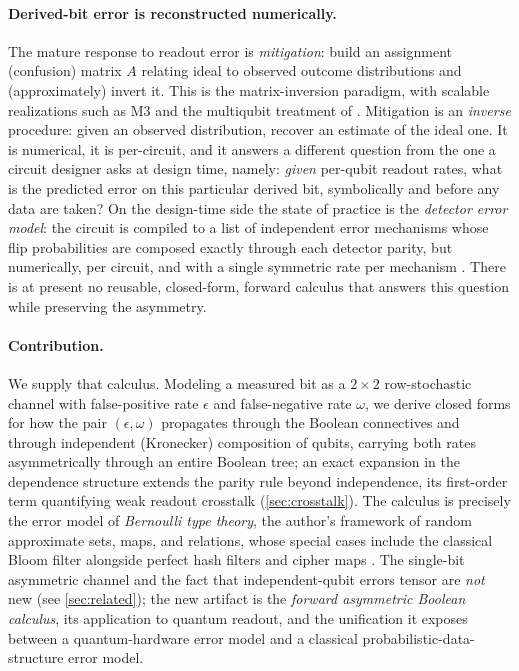 \documentclass[a4paper,onecolumn,unpublished,nopdfoutputerror,allowtoday]{quantumarticle}
\numberwithin{equation}{section}
\theoremstyle{plain}
\theoremstyle{definition}
\theoremstyle{remark}
\newcommand{\eps}{\epsilon}
\begin{document}
\paragraph{Derived-bit error is reconstructed numerically.} The mature response
to readout error is \emph{mitigation}: build an assignment (confusion) matrix $A$
relating ideal to observed outcome distributions and (approximately) invert it.
This is the matrix-inversion paradigm, with scalable realizations such as M3
\citep{nation2021m3} and the multiqubit treatment of \citet{bravyi2021mitigating}.
Mitigation is an \emph{inverse} procedure: given an observed distribution, recover
an estimate of the ideal one. It is numerical, it is per-circuit, and it answers
a different question from the one a circuit designer asks at design time, namely:
\emph{given} per-qubit readout rates, what is the predicted error on this
particular derived bit, symbolically and before any data are taken? On the
design-time side the state of practice is the \emph{detector error model}: the
circuit is compiled to a list of independent error mechanisms whose flip
probabilities are composed exactly through each detector parity, but
numerically, per circuit, and with a single symmetric rate per mechanism
\citep{gidney2021stim}. There is at
present no reusable, closed-form, forward calculus that answers this question
while preserving the asymmetry.

\paragraph{Contribution.} We supply that calculus. Modeling a measured bit as a
$2\times2$ row-stochastic channel with false-positive rate $\eps$ and
false-negative rate $\omega$, we derive closed forms for how the pair
$(\eps,\omega)$ propagates through the Boolean connectives and through
independent (Kronecker) composition of qubits, carrying both rates
asymmetrically through an entire Boolean tree; an exact expansion in the
dependence structure extends the parity rule beyond independence, its
first-order term quantifying weak readout crosstalk (\cref{sec:crosstalk}). The calculus is precisely the
error model of \emph{Bernoulli type theory}, the author's framework of random
approximate sets, maps, and relations, whose special cases include the classical
Bloom filter \citep{bloom1970} alongside perfect hash filters and
cipher maps \citep{bernoulliSets,bernoulliComposition,bernoulliMaps}.
The single-bit asymmetric channel and the fact that independent-qubit errors
tensor are \emph{not} new (see \cref{sec:related}); the new artifact is the
\emph{forward asymmetric Boolean calculus}, its application to quantum readout,
and the unification it exposes between a quantum-hardware error model and a
classical probabilistic-data-structure error model.
\end{document}
